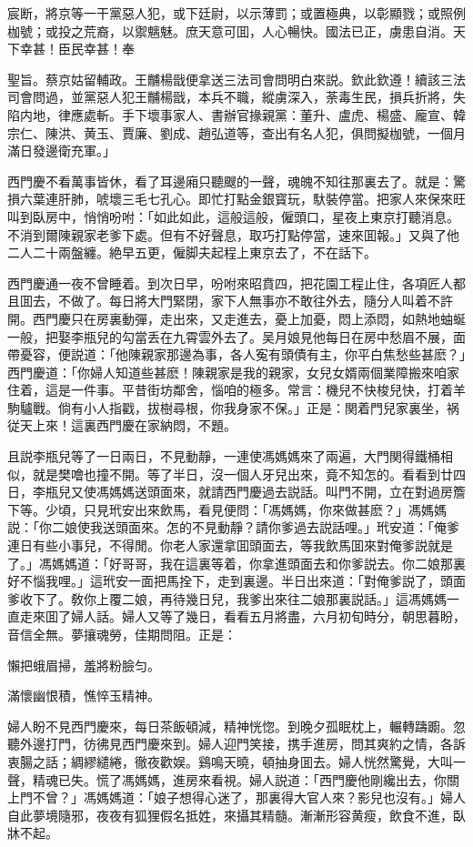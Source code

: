宸断，將京等一干黨惡人犯，或下廷尉，以示薄罰；或置極典，以彰顯戮；或照例枷號；或投之荒裔，以禦魑魅。庶天意可囬，人心暢快。國法已正，虜患自消。天下幸甚！臣民幸甚！奉

聖旨。蔡京姑留輔政。王黼楊戩便拿送三法司會問明白來説。欽此欽遵！續該三法司會問過，並黨惡人犯王黼楊戩，本兵不職，縱虜深入，荼毒生民，損兵折將，失陷内地，律應處斬。手下壞事家人、書辦官掾親黨：董升、盧虎、楊盛、龐宣、韓宗仁、陳洪、黄玉、賈廉、劉成、趙弘道等，查出有名人犯，俱問擬枷號，一個月滿日發邊衛充軍。」

西門慶不看萬事皆休，看了耳邊廂只聽颼的一聲，魂魄不知往那裏去了。就是：驚損六葉連肝肺，唬壞三毛七孔心。即忙打點金銀寳玩，馱裝停當。把家人來保來旺叫到臥房中，悄悄吩咐：「如此如此，這般這般，僱頭口，星夜上東京打聽消息。不消到爾陳親家老爹下處。但有不好聲息，取巧打點停當，速來囬報。」又與了他二人二十兩盤纏。絶早五更，僱脚夫起程上東京去了，不在話下。

西門慶通一夜不曾睡着。到次日早，吩咐來昭賁四，把花園工程止住，各項匠人都且囬去，不做了。每日將大門緊閉，家下人無事亦不敢往外去，隨分人叫着不許開。西門慶只在房裏動彈，走出來，又走進去，憂上加憂，悶上添悶，如熱地蚰蜒一般，把娶李瓶兒的勾當丢在九霄雲外去了。吴月娘見他每日在房中愁眉不展，面帶憂容，便説道：「他陳親家那邊為事，各人寃有頭債有主，你平白焦愁些甚麽？」西門慶道：「你婦人知道些甚麽！陳親家是我的親家，女兒女婿兩個業障搬來咱家住着，這是一件事。平昔街坊鄰舍，惱咱的極多。常言：機兒不快梭兒快，打着羊駒驢戰。倘有小人指戳，拔樹尋根，你我身家不保。」正是：関着門兒家裏坐，祸従天上來！這裏西門慶在家納悶，不題。

且説李瓶兒等了一日兩日，不見動靜，一連使馮媽媽來了兩遍，大門関得鐵桶相似，就是樊噲也撞不開。等了半日，沒一個人牙兒出來，竟不知怎的。看看到廿四日，李瓶兒又使馮媽媽送頭面來，就請西門慶過去説話。叫門不開，立在對過房簷下等。少頃，只見玳安出來飲馬，看見便問：「馮媽媽，你來做甚麽？」馮媽媽説：「你二娘使我送頭面來。怎的不見動靜？請你爹過去説話哩。」玳安道：「俺爹連日有些小事兒，不得閒。你老人家還拿囬頭面去，等我飲馬囬來對俺爹説就是了。」馮媽媽道：「好哥哥，我在這裏等着，你拿進頭面去和你爹説去。你二娘那裏好不惱我哩。」這玳安一面把馬拴下，走到裏邊。半日出來道：「對俺爹説了，頭面爹收下了。敎你上覆二娘，再待幾日兒，我爹出來往二娘那裏説話。」這馮媽媽一直走來囬了婦人話。婦人又等了幾日，看看五月將盡，六月初旬時分，朝思暮盼，音信全無。夢攘魂勞，佳期問阻。正是：

懶把蛾眉掃，羞將粉臉匀。

滿懷幽恨積，憔悴玉精神。

婦人盼不見西門慶來，每日茶飯頓減，精神恍惚。到晚夕孤眠枕上，輾轉躊躕。忽聽外邊打門，彷彿見西門慶來到。婦人迎門笑接，携手進房，問其爽約之情，各訴衷腸之話；綢繆繾綣，徹夜歡娱。鷄鳴天曉，頓抽身囬去。婦人恍然驚覺，大叫一聲，精魂已失。慌了馮媽媽，進房來看視。婦人説道：「西門慶他剛纔出去，你關上門不曾？」馮媽媽道：「娘子想得心迷了，那裏得大官人來？影兒也沒有。」婦人自此夢境隨邪，夜夜有狐狸假名抵姓，來攝其精髓。漸漸形容黄瘦，飲食不進，臥牀不起。

